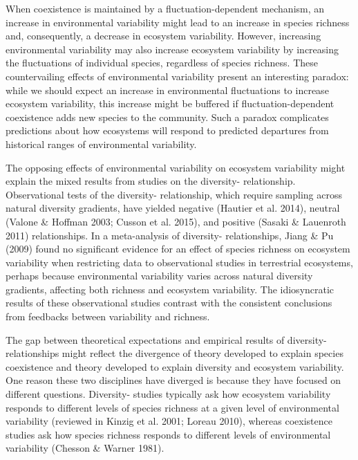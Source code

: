 \documentclass[12pt,]{article}
\begin{document}
When coexistence is maintained by a fluctuation-dependent mechanism, an
increase in environmental variability might lead to an increase in
species richness and, consequently, a decrease in ecosystem variability.
However, increasing environmental variability may also increase
ecosystem variability by increasing the fluctuations of individual
species, regardless of species richness. These countervailing effects of
environmental variability present an interesting paradox: while we
should expect an increase in environmental fluctuations to increase
ecosystem variability, this increase might be buffered if
fluctuation-dependent coexistence adds new species to the community.
Such a paradox complicates predictions about how ecosystems will respond
to predicted departures from historical ranges of environmental
variability.

The opposing effects of environmental variability on ecosystem
variability might explain the mixed results from 
studies on the diversity- relationship.
Observational tests of the diversity-
relationship, which require sampling across natural diversity gradients,
have yielded negative (Hautier et al. 2014), neutral (Valone \& Hoffman
2003; Cusson et al. 2015), and positive (Sasaki \& Lauenroth 2011)
relationships. In a meta-analysis of
diversity- relationships, Jiang \& Pu (2009)
found no significant evidence for an effect of species richness on
ecosystem variability when restricting data to observational studies in
terrestrial ecosystems, perhaps because environmental variability varies
across natural diversity gradients, affecting both richness and
ecosystem variability. The idiosyncratic results of these observational
studies contrast with the consistent conclusions from
feedbacks between variability and richness.

The gap between theoretical expectations and empirical results of
diversity- relationships might reflect the
divergence of theory developed to explain species coexistence and theory
developed to explain diversity and ecosystem variability.
One reason these two disciplines have diverged is because they have
focused on different questions. Diversity-
studies typically ask how ecosystem variability responds to different
levels of species richness at a given level of environmental variability
(reviewed in Kinzig et al. 2001; Loreau 2010), whereas coexistence
studies ask how species richness responds to different levels of
environmental variability (Chesson \& Warner 1981).
\end{document}
